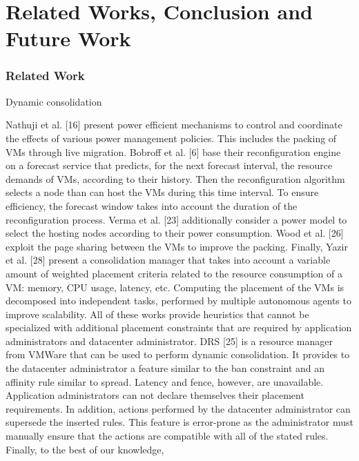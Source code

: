 \part{Related Works, Conclusion and Future Work} 
\section{Related Work} 
\begin{frame}[allowframebreaks]{Dynamic consolidation}

Nathuji et al. [16] present power efficient mechanisms to control and
 coordinate the effects of various power management policies. This 
includes the packing of VMs through live migration. Bobroff et al. [6]
base their reconfiguration engine on a forecast service that predicts, for the next
forecast interval, the resource demands of VMs, according to their history. Then
the reconfiguration algorithm selects a node than can host the VMs during this
time interval. To ensure efficiency, the forecast window takes into account the
duration of the reconfiguration process. Verma et al. [23] additionally consider
a power model to select the hosting nodes according to their power consumption. 
Wood et al. [26] exploit the page sharing between the VMs to improve the
packing. Finally, Yazir et al. [28] present a consolidation manager that takes
into account a variable amount of weighted placement criteria related to the
resource consumption of a VM: memory, CPU usage, latency, etc. Computing
the placement of the VMs is decomposed into independent tasks, performed by
multiple autonomous agents to improve scalability. All of these works provide
heuristics that cannot be specialized with additional placement constraints that
are required by application administrators and datacenter administrator.
\br                                                                                                                                                             DRS [25] is a resource manager from VMWare that can be used to perform
dynamic consolidation. It provides to the datacenter administrator a feature
similar to the ban constraint and an affinity rule similar to spread. Latency
and fence, however, are unavailable. Application administrators can not declare 
themselves their placement requirements. In addition, actions performed
by the datacenter administrator can supersede the inserted rules. This feature
is error-prone as the administrator must manually ensure that the actions are
compatible with all of the stated rules. Finally, to the best of our knowledge,

\end{frame}
